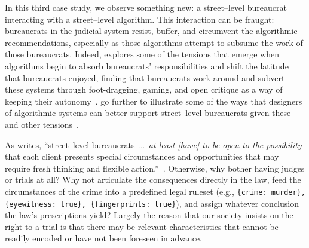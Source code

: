 \documentclass[main]{subfiles}
\begin{document}
In this third case study, we observe something new: a street--level bureaucrat interacting with a street--level algorithm.
This interaction can be fraught:
bureaucrats in the judicial system resist, buffer, and circumvent
the algorithmic recommendations, especially as those algorithms attempt to subsume the work of those bureaucrats.
Indeed, \citeauthor{doi:10.1177/2053951717718855} explores some of the tensions that emerge
when algorithms begin to absorb bureaucrats' responsibilities and shift the latitude that bureaucrats enjoyed,
finding that bureaucrats work around and subvert these systems through
foot-dragging, gaming, and open critique as a way of keeping their autonomy~\cite{doi:10.1177/2053951717718855}.
\citeauthor{Veale:2018:FAD:3173574.3174014} go further to illustrate some of the ways that
designers of algorithmic systems can better support
street--level bureaucrats given these and other tensions~\cite{Veale:2018:FAD:3173574.3174014}.

As \citeauthor{lipsky1983street} writes,
``street--level bureaucrats~\dots~\textit{at least [have] to be open to the possibility}
that each client presents special circumstances and opportunities
that may require fresh thinking and flexible action.''~\cite{lipsky1983street}.
Otherwise, why bother having judges or trials at all?
Why not articulate the consequences directly in the law,
feed the circumstances of the crime into a predefined legal ruleset
(e.g., \texttt{\{crime: murder\}, \{eyewitness: true\}, \{fingerprints: true\}}), and
assign whatever conclusion the law's prescriptions yield?
Largely the reason that our society insists on the right to a trial is that
there may be relevant characteristics that cannot be readily encoded or have not been foreseen in advance.
\end{document}
